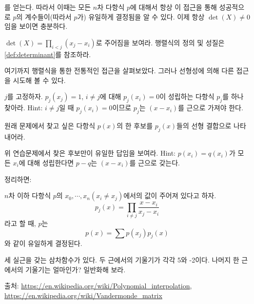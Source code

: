 를 얻는다. 따라서 이때는 모든 $n$차 다항식 $p$에 대해서 항상 이 접근을 통해 성공적으로 $p$의 계수들이(따라서 $p$가) 유일하게 결정됨을 알 수 있다. 이제 항상 $\det(X)\neq 0$임을 보이면 충분하다. 
\begin{exercise}\label{exer:vandet}
    $\det(X)=\prod_{i<j}(x_j-x_i)$로 주어짐을 보여라. 행렬식의 정의 및 성질은 \cref{def:determinant}를 참조하라. 
\end{exercise}
여기까지 행렬식을 통한 전통적인 접근을 살펴보았다. 그러나 선형성에 의해 다른 접근을 시도해 볼 수 있다. 
\begin{exercise}
    $j$를 고정하자. $p_j(x_j)=1$, $i\neq j$에 대해 $p_j(x_i)=0$이 성립하는 다항식 $p_j$를 하나 찾아라. Hint: $i\neq j$일 때 $p_j(x_i)=0$이므로 $p_j$는 $(x-x_i)$를 근으로 가져야 한다.  
\end{exercise}
\begin{exercise}
    원래 문제에서 찾고 싶은 다항식 $p(x)$의 한 후보를 $p_j(x)$들의 선형 결합으로 나타내어라. 
\end{exercise}
\begin{exercise}
    위 연습문제에서 찾은 후보만이 유일한 답임을 보여라. Hint: $p(x_i)=q(x_i)$가 모든 $x_i$에 대해 성립한다면 $p-q$는 $(x-x_i)$를 근으로 갖는다. 
\end{exercise}
정리하면: 
\begin{theorem}\label{thm:lagrange-intp}
$n$차 이하 다항식 $p$의 $x_0, \cdots, x_n(x_i\neq x_j)$에서의 값이 주어져 있다고 하자. $$p_j(x)=\prod_{i\neq j} \frac{x-x_i}{x_j-x_i}$$라고 할 때, $p$는 $$p(x)=\sum p(x_j)p_j(x)$$와 같이 유일하게 결정된다. 
\end{theorem}
\begin{exercise}
    세 실근을 갖는 삼차함수가 있다. 두 근에서의 기울기가 각각 5와 -2이다. 나머지 한 근에서의 기울기는 얼마인가? 일반화해 보라. 
\end{exercise}
출처: \url{https://en.wikipedia.org/wiki/Polynomial_interpolation}, \url{https://en.wikipedia.org/wiki/Vandermonde_matrix}

